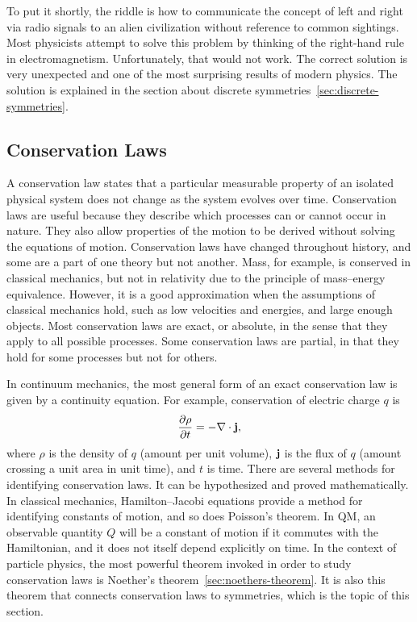 To put it shortly, the riddle is how to communicate the concept of left and right via radio signals to an alien civilization without reference to common sightings. Most physicists attempt to solve this problem by thinking of the right-hand rule in electromagnetism. Unfortunately, that would not work. The correct solution is very unexpected and one of the most surprising results of modern physics. The solution is explained in the section about discrete symmetries~\ref{sec:discrete-symmetries}.

\subsection{Conservation Laws}

A conservation law states that a particular measurable property of an isolated physical system does not change as the system evolves over time. Conservation laws are useful because they describe which processes can or cannot occur in nature. They also allow properties of the motion to be derived without solving the equations of motion. Conservation laws have changed throughout history, and some are a part of one theory but not another. Mass, for example, is conserved in classical mechanics, but not in relativity due to the principle of mass–energy equivalence. However, it is a good approximation when the assumptions of classical mechanics hold, such as low velocities and energies, and large enough objects. Most conservation laws are exact, or absolute, in the sense that they apply to all possible processes. Some conservation laws are partial, in that they hold for some processes but not for others.

In continuum mechanics, the most general form of an exact conservation law is given by a continuity equation. For example, conservation of electric charge $q$ is
\begin{equation}
\pdv{\rho}{t}=-\nabla\cdot\vb{j},
\end{equation}
where $\rho$ is the density of $q$ (amount per unit volume), $\vb{j}$ is the flux of $q$ (amount crossing a unit area in unit time), and $t$ is time. There are several methods for identifying conservation laws. It can be hypothesized and proved mathematically. In classical mechanics, Hamilton–Jacobi equations provide a method for identifying constants of motion, and so does Poisson's theorem. In QM, an observable quantity $Q$ will be a constant of motion if it commutes with the Hamiltonian, and it does not itself depend explicitly on time. In the context of particle physics, the most powerful theorem invoked in order to study conservation laws is Noether's theorem~\ref{sec:noethers-theorem}. It is also this theorem that connects conservation laws to symmetries, which is the topic of this section.

